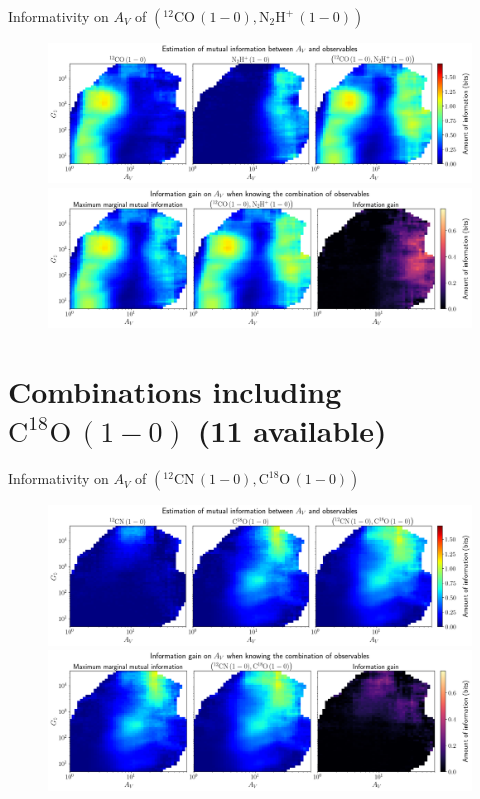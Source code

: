 \documentclass{beamer}
\begin{document}
\begin{frame}{Informativity on $A_V$ of $\left(\mathrm{^{12}CO\,(1-0)},\mathrm{N_2H^+\,(1-0)}\right)$}
    \begin{figure}
        \centering
        \includegraphics[width=0.95\linewidth]{../mi/av__12co10_n2hp10_mi.png}
        \vfill
        \includegraphics[width=0.95\linewidth]{../mi/av__12co10_n2hp10_mi_gain.png}
    \end{figure}
\end{frame}

\section{Combinations including $\mathrm{C^{18}O\,(1-0)}$ (11 available)}

\begin{frame}{Informativity on $A_V$ of $\left(\mathrm{^{12}CN\,(1-0)},\mathrm{C^{18}O\,(1-0)}\right)$}
    \begin{figure}
        \centering
        \includegraphics[width=0.95\linewidth]{../mi/av__12cn10_c18o10_mi.png}
        \vfill
        \includegraphics[width=0.95\linewidth]{../mi/av__12cn10_c18o10_mi_gain.png}
    \end{figure}
\end{frame}
\end{document}
